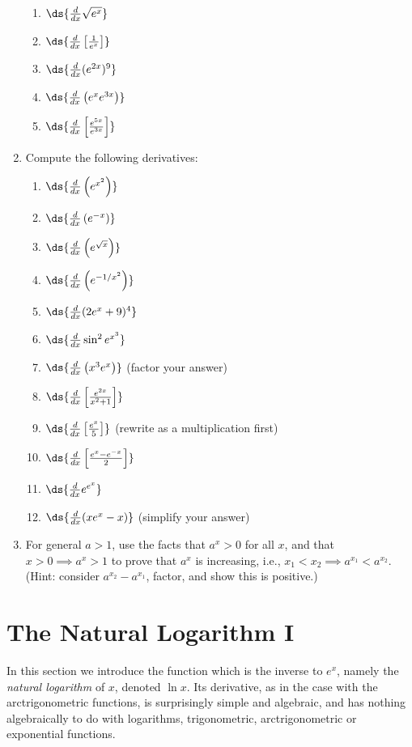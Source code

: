 \begin{multicols}{2}
\begin{enumerate}
\begin{enumerate}
  \item $\ds{\frac{d}{dx}\sqrt{e^x}}$
  \item $\ds{\frac{d}{dx}\left[\frac1{e^x}\right]}$
  \item $\ds{\frac{d}{dx}(e^{2x})^{9}}$
  \item $\ds{\frac{d}{dx}\left(e^xe^{3x}\right)}$
  \item $\ds{\frac{d}{dx}\left[\frac{e^{5x}}{e^{3x}}\right]}$
\end{enumerate}
\item Compute the following derivatives:
\begin{enumerate}
  \item $\ds{\frac{d}{dx}\left(e^{x^2}\right)}$
  \item $\ds{\frac{d}{dx}\left(e^{-x}\right)}$
  \item $\ds{\frac{d}{dx}\left(e^{\sqrt{x}}\right)}$
  \item $\ds{\frac{d}{dx}\left(e^{-1/x^2}\right)}$
  \item $\ds{\frac{d}{dx}(2e^x+9)^4}$
  \item $\ds{\frac{d}{dx}\sin^2e^{x^3}}$
  \item $\ds{\frac{d}{dx}\left(x^3e^x\right)}$ (factor your answer)
  \item $\ds{\frac{d}{dx}\left[\frac{e^{2x}}{x^2+1}\right]}$
  \item $\ds{\frac{d}{dx}\left[\frac{e^x}5\right]}$  
            (rewrite as a multiplication first)
  \item $\ds{\frac{d}{dx}\left[\frac{e^x-e^{-x}}{2}\right]}$
  \item $\ds{\frac{d}{dx}e^{e^x}}$
  \item $\ds{\frac{d}{dx}(xe^x-x)}$ (simplify your answer)

\end{enumerate}
\item For general $a>1$,  use the facts that $a^x>0$ for all $x$,
     and  that $x>0\implies a^x>1$
      to prove that $a^x$ is increasing, i.e., 
      $x_1<x_2\implies a^{x_1}<a^{x_2}$.
      (Hint: consider $a^{x_2}-a^{x_1}$, factor, and show this is 
       positive.)
\end{enumerate}
\end{multicols}

\newpage
\section{The Natural Logarithm I}
In this section we introduce the function which is the inverse
to $e^x$, namely the {\it natural logarithm} of $x$,
denoted $\ln x$.  Its derivative, as in the case with
the arctrigonometric functions, is surprisingly
simple and algebraic, and has nothing algebraically to do with
logarithms, trigonometric, arctrigonometric or exponential
functions.

